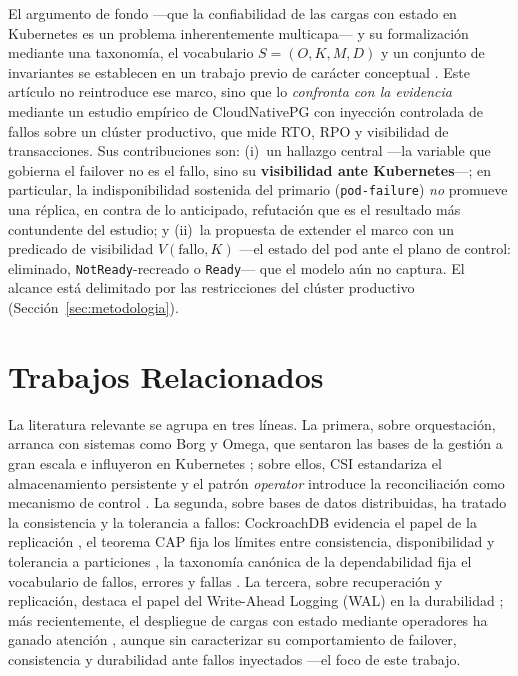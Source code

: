 \documentclass[a4paper]{llncs}
\begin{document}
El argumento de fondo ---que la confiabilidad de las cargas con estado en
Kubernetes es un problema inherentemente multicapa--- y su formalización mediante
una taxonomía, el vocabulario $S=(O,K,M,D)$ y un conjunto de invariantes se
establecen en un trabajo previo de carácter conceptual \cite{parejo2026}. Este
artículo no reintroduce ese marco, sino que lo \emph{confronta con la evidencia}
mediante un estudio empírico de CloudNativePG con inyección controlada de fallos
sobre un clúster productivo, que mide RTO, RPO y visibilidad de transacciones. Sus
contribuciones son: (i)~un hallazgo central ---la variable que gobierna el failover
no es el fallo, sino su \textbf{visibilidad ante Kubernetes}---; en particular, la
indisponibilidad sostenida del primario (\texttt{pod-failure}) \emph{no} promueve
una réplica, en contra de lo anticipado, refutación que es el resultado más
contundente del estudio; y (ii)~la propuesta de extender el marco con un
predicado de visibilidad $V(\text{fallo}, K)$ ---el estado del pod ante el plano de
control: eliminado, \texttt{NotReady}-recreado o \texttt{Ready}--- que el modelo
aún no captura. El alcance está delimitado por las restricciones del clúster
productivo (Sección~\ref{sec:metodologia}).

\section{Trabajos Relacionados}

La literatura relevante se agrupa en tres líneas. La primera, sobre
orquestación, arranca con sistemas como Borg y Omega, que sentaron las bases de
la gestión a gran escala e influyeron en Kubernetes \cite{burns2016};
sobre ellos, CSI estandariza el almacenamiento persistente \cite{csi} y el
patrón \emph{operator} introduce la reconciliación como mecanismo de control
\cite{k8soperator}. La segunda, sobre bases de datos distribuidas, ha tratado
la consistencia y la tolerancia a fallos: CockroachDB evidencia el papel de la
replicación \cite{cockroachdb}, el teorema CAP fija los límites entre
consistencia, disponibilidad y tolerancia a particiones
\cite{bailis2013,gilbert2002}, la taxonomía canónica de la
dependabilidad fija el vocabulario de fallos, errores y fallas
\cite{avizienis2004}. La tercera, sobre recuperación y replicación, destaca el
papel del Write-Ahead Logging (WAL) en la durabilidad
\cite{han2024,stonebraker1991}; más recientemente, el despliegue de
cargas con estado mediante operadores ha ganado atención
\cite{dobies2020,mega2023}, aunque sin caracterizar su comportamiento de
failover, consistencia y durabilidad ante fallos inyectados ---el foco de este
trabajo.
\end{document}
